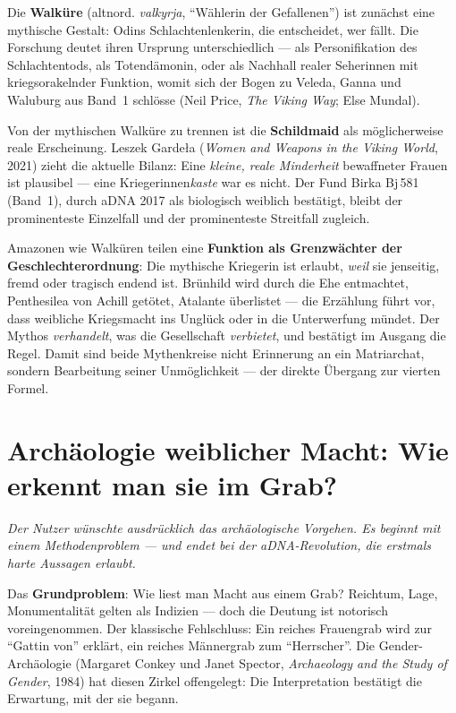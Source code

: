 \documentclass[11pt,a4paper,ngerman]{scrartcl}
\newcommand{\chipbase}[2]{\hspace{0pt}{\footnotesize\textcolor{#1}{[\textsc{#2}]}}}
\newcommand{\chipbelegt}[1]{\chipbase{chipgreen}{#1}}
\newcommand{\chipplausibel}[1]{\chipbase{chipamber}{#1}}
\newcommand{\chipumstritten}[1]{\chipbase{chipred}{#1}}
\begin{document}
Die \textbf{Walküre} (altnord. \emph{valkyrja}, \enquote{Wählerin der Gefallenen}) ist zunächst eine mythische Gestalt: Odins Schlachtenlenkerin, die entscheidet, wer fällt. Die Forschung deutet ihren Ursprung unterschiedlich --- als Personifikation des Schlachtentods, als Totendämonin, oder als Nachhall realer Seherinnen mit kriegsorakelnder Funktion, womit sich der Bogen zu Veleda, Ganna und Waluburg aus Band~1 schlösse (Neil Price, \emph{The Viking Way}; Else Mundal). \chipumstritten{umstritten}

Von der mythischen Walküre zu trennen ist die \textbf{Schildmaid} als möglicherweise reale Erscheinung. Leszek Garde\l{}a (\emph{Women and Weapons in the Viking World}, 2021) zieht die aktuelle Bilanz: Eine \emph{kleine, reale Minderheit} bewaffneter Frauen ist plausibel --- eine Kriegerinnen\emph{kaste} war es nicht. Der Fund Birka Bj\,581 (Band~1), durch aDNA 2017 als biologisch weiblich bestätigt, bleibt der prominenteste Einzelfall und der prominenteste Streitfall zugleich. \chipumstritten{umstritten}

Amazonen wie Walküren teilen eine \textbf{Funktion als Grenzwächter der Geschlechterordnung}: Die mythische Kriegerin ist erlaubt, \emph{weil} sie jenseitig, fremd oder tragisch endend ist. Brünhild wird durch die Ehe entmachtet, Penthesilea von Achill getötet, Atalante überlistet --- die Erzählung führt vor, dass weibliche Kriegsmacht ins Unglück oder in die Unterwerfung mündet. Der Mythos \emph{verhandelt}, was die Gesellschaft \emph{verbietet}, und bestätigt im Ausgang die Regel. \chipplausibel{plausibel} Damit sind beide Mythenkreise nicht Erinnerung an ein Matriarchat, sondern Bearbeitung seiner Unmöglichkeit --- der direkte Übergang zur vierten Formel.
\section{Archäologie weiblicher Macht: Wie erkennt man sie im Grab?}
\noindent\textit{Der Nutzer wünschte ausdrücklich das archäologische Vorgehen. Es beginnt mit einem Methodenproblem --- und endet bei der aDNA-Revolution, die erstmals harte Aussagen erlaubt.}
\medskip

Das \textbf{Grundproblem}: Wie liest man Macht aus einem Grab? Reichtum, Lage, Monumentalität gelten als Indizien --- doch die Deutung ist notorisch voreingenommen. Der klassische Fehlschluss: Ein reiches Frauengrab wird zur \enquote{Gattin von} erklärt, ein reiches Männergrab zum \enquote{Herrscher}. Die Gender-Archäologie (Margaret Conkey und Janet Spector, \emph{Archaeology and the Study of Gender}, 1984) hat diesen Zirkel offengelegt: Die Interpretation bestätigt die Erwartung, mit der sie begann. \chipbelegt{belegt}
\end{document}
